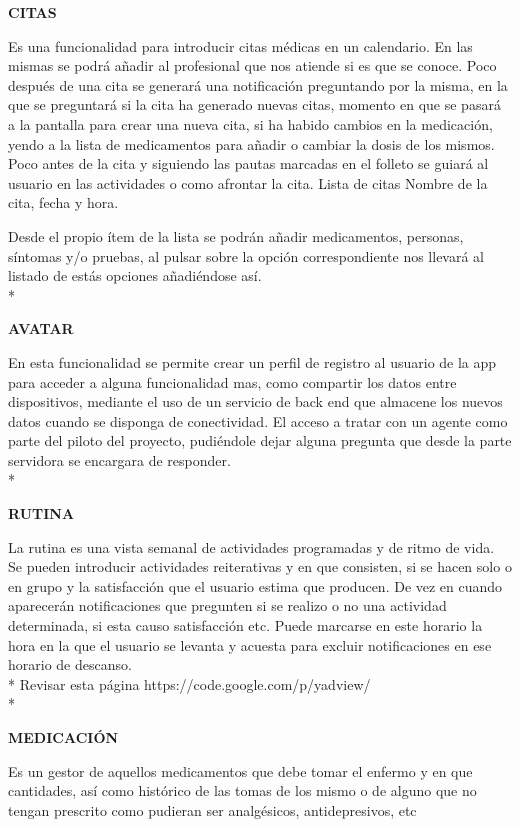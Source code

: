 \documentclass[../pfc.tex]{subfiles}
\begin{document}
	\textbf{CITAS}
	
	Es una funcionalidad para introducir citas médicas en un calendario. En las mismas se podrá añadir al profesional que nos atiende si es que se conoce. 
	Poco después de una cita se generará una notificación preguntando por la misma, en la que se preguntará si la cita ha generado nuevas citas, momento en que se pasará a la pantalla para crear una nueva cita, si ha habido cambios en la medicación, yendo a la lista de medicamentos para añadir o cambiar la dosis de los mismos.
	Poco antes de la cita y siguiendo las pautas marcadas en el folleto se guiará al usuario en las actividades o como afrontar la cita.
	Lista de citas Nombre de la cita, fecha y hora.

	Desde el propio ítem de la lista se podrán añadir medicamentos, personas, síntomas y/o pruebas, al pulsar sobre la opción correspondiente nos llevará al listado de estás opciones añadiéndose así.\\*
	
	\clearpage
	
	\textbf{AVATAR}
	
	En esta funcionalidad se permite crear un perfil de registro al usuario de la app para acceder a alguna funcionalidad mas, como compartir los datos entre dispositivos, mediante el uso de un servicio de back end que almacene los nuevos datos cuando se disponga de conectividad. El acceso a tratar con un agente como parte del piloto del proyecto, pudiéndole dejar alguna pregunta que desde la parte servidora se encargara de responder.\\*

	\textbf{RUTINA}
	
	La rutina es una vista semanal de actividades programadas y de ritmo de vida. Se pueden introducir actividades reiterativas y en que consisten, si se hacen solo o en grupo y la satisfacción que el usuario estima que producen. De vez en cuando aparecerán notificaciones que pregunten si se realizo o no una actividad determinada, si esta causo satisfacción etc. Puede marcarse en este horario la hora en la que el usuario se levanta y acuesta para excluir notificaciones en ese horario de descanso. \\*
	Revisar esta página	https://code.google.com/p/yadview/\\*
		
	
	\textbf{MEDICACIÓN}
	
	Es un gestor de aquellos medicamentos que debe tomar el enfermo y en que cantidades, así como histórico de las tomas de los mismo o de alguno que no tengan prescrito como pudieran ser analgésicos, antidepresivos, etc 
	
\end{document}
